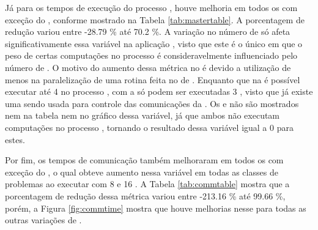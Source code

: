 Já para os tempos de execução do processo \master, houve melhoria em todos os  com exceção do \LU, conforme mostrado na Tabela \ref{tab:mastertable}. A porcentagem de redução variou entre -28.79 \% até 70.2 \%. A variação no número de \clusters só afeta significativamente essa variável na aplicação \KM, visto que este é o único  em que o peso de certas computações no processo \master é consideravelmente influenciado pelo número de \clusters. O motivo do aumento dessa métrica no \LU é devido a utilização de menos \threads na paralelização de uma rotina feita no \cluster de \IO. Enquanto que na \IPC é possível executar até 4 \threads no processo \master, com a \ASYNC só podem ser executadas 3 \threads, visto que já existe uma \thread sendo usada para controle das comunicações da \API. Os  \FAST e \GF não são mostrados nem na tabela nem no gráfico dessa variável, já que ambos não executam computações no processo \master, tornando o resultado dessa variável igual a 0 para estes.


\begin{table}[h]
\centering
\caption{Reduções ao comparar-se os tempos do processo \master.}
\label{tab:mastertable}
\end{table}

Por fim, os tempos de comunicação também melhoraram em todos os  com exceção do \IS, o qual obteve aumento nessa variável em todas as classes de problemas ao executar com 8 e 16 \clusters. A Tabela \ref{tab:commtable} mostra que a porcentagem de redução dessa métrica variou entre -213.16 \% até 99.66 \%, porém, a Figura \ref{fig:commtime} mostra que houve melhorias nesse  para todas as outras variações de \clusters.

